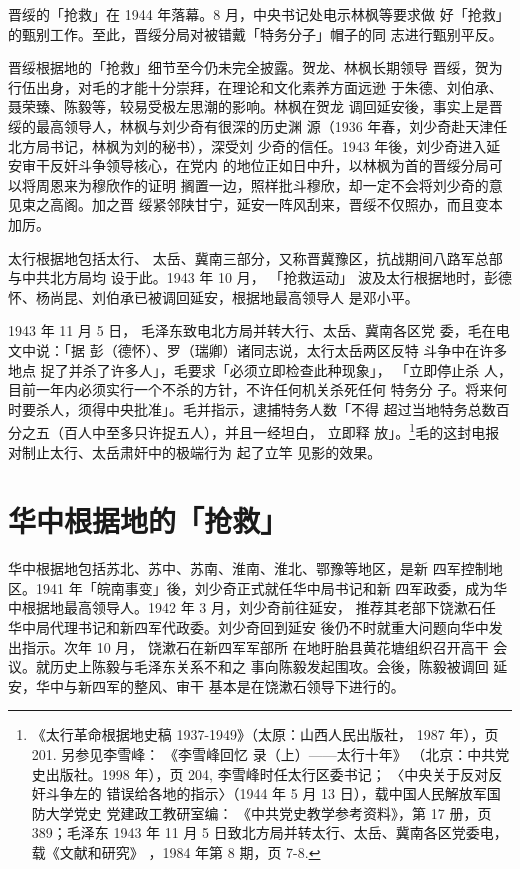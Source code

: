 晋绥的「抢救」在 1944 年落幕。8 月，中央书记处电示林枫等要求做
好「抢救」的甄别工作。至此，晋绥分局对被错戴「特务分子」帽子的同
志进行甄别平反。

晋绥根据地的「抢救」细节至今仍未完全披露。贺龙、林枫长期领导
晋绥，贺为行伍出身，对毛的才能十分崇拜，在理论和文化素养方面远逊
于朱德、刘伯承、聂荣臻、陈毅等，较易受极左思潮的影响。林枫在贺龙
调回延安後，事实上是晋绥的最高领导人，林枫与刘少奇有很深的历史渊
源（1936 年春，刘少奇赴天津任北方局书记，林枫为刘的秘书），深受刘
少奇的信任。1943 年後，刘少奇进入延安审干反奸斗争领导核心，在党内
的地位正如日中升，以林枫为首的晋绥分局可以将周恩来为穆欣作的证明
搁置一边，照样批斗穆欣，却一定不会将刘少奇的意见束之高阁。加之晋
绥紧邻陕甘宁，延安一阵风刮来，晋绥不仅照办，而且变本加厉。

太行根据地包括太行、
太岳、冀南三部分，又称晋冀豫区，抗战期间八路军总部与中共北方局均
设于此。1943 年 10 月，
「抢救运动」
波及太行根据地时，彭德怀、杨尚昆、刘伯承已被调回延安，根据地最高领导人
是邓小平。

1943 年 11 月 5 日， 毛泽东致电北方局并转大行、太岳、冀南各区党
委，毛在电文中说：「据 彭（德怀）、罗（瑞卿）诸同志说，太行太岳两区反特
斗争中在许多地点 捉了并杀了许多人」，毛要求「必须立即检查此种现象」，
「立即停止杀 人，目前一年内必须实行一个不杀的方针，不许任何机关杀死任何
特务分 子。将来何时要杀人，须得中央批准」。毛并指示，逮捕特务人数「不得
超过当地特务总数百分之五（百人中至多只许捉五人），并且一经坦白， 立即释
放」。\footnote{《太行革命根据地史稿 1937-1949》（太原：山西人民出版社，
1987 年），页 201. 另参见李雪峰： 《李雪峰回忆 录（上）——太行十年》
（北京：中共党史出版社。1998 年），页 204, 李雪峰时任太行区委书记；
〈中央关于反对反奸斗争左的
错误给各地的指示〉（1944 年 5 月 13 日），载中国人民解放军国防大学党史
党建政工教研室编： 《中共党史教学参考资料》，第 17 册，页 389；毛泽东
1943 年 11 月 5 日致北方局并转太行、太岳、冀南各区党委电，载《文献和研究》
，1984 年第 8 期，页 7-8.  }毛的这封电报对制止太行、太岳肃奸中的极端行为
起了立竿 见影的效果。

\section{华中根据地的「抢救」}

华中根据地包括苏北、苏中、苏南、淮南、淮北、鄂豫等地区，是新 四军控制地
区。1941 年「皖南事变」後，刘少奇正式就任华中局书记和新 四军政委，成为华
中根据地最高领导人。1942 年 3 月，刘少奇前往延安， 推荐其老部下饶漱石任
华中局代理书记和新四军代政委。刘少奇回到延安 後仍不时就重大问题向华中发
出指示。次年 10 月， 饶漱石在新四军军部所 在地盱胎县黄花塘组织召开高干
会议。就历史上陈毅与毛泽东关系不和之 事向陈毅发起围攻。会後，陈毅被调回
延安，华中与新四军的整风、审干 基本是在饶漱石领导下进行的。


